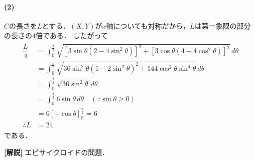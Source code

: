 \documentclass[../../main.tex]{subfiles}
\begin{document}
\paragraph{(2)}

$C$の長さを$L$とする．$(X,Y)$が$x$軸についても対称だから，$L$は第一象限の部分の長さの$4$倍である．
したがって
\begin{align}
  \begin{split}
    \dfrac{L}{4}
    &=\int_0^{\frac{\pi}{2}}\sqrt{\left[3\sin\theta(2-4\sin^2\theta)\right]^2+\left[3\cos\theta(4-4\cos^2\theta)\right]^2}\,d\theta \\
    &=\int_0^{\frac{\pi}{2}}\sqrt{36\sin^2\theta(1-2\sin^2\theta)^2+144\cos^2\theta\sin^4\theta}\,d\theta \\
    &=\int_0^{\frac{\pi}{2}}\sqrt{36\sin^2\theta}\,d\theta \\
    &=\int_0^{\frac{\pi}{2}}6\sin\theta\,d\theta \quad(\because\sin\theta\ge0) \\
    &=6\left[-\cos\theta\right]_0^{\frac{\pi}{2}}=6 \\
    \therefore
    L&=24
  \end{split}
\end{align}
である．

{\bf [解説]}
エピサイクロイドの問題．

\newpage
\end{document}

